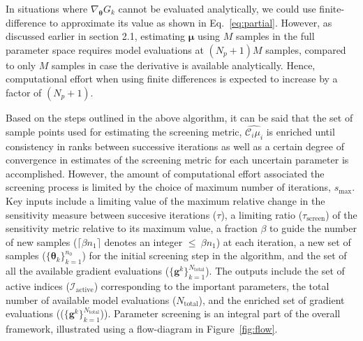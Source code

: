 In situations where $\nabla_{\bm{\theta}}G_k$ cannot be evaluated analytically, we could use finite-difference
to approximate its value as shown in Eq.~\ref{eq:partial}. However, as discussed earlier
in section 2.1, estimating $\bm{\mu}$  using $M$ samples in the full parameter space requires 
model evaluations at $(N_p+1)M$ samples, compared to only $M$ samples in 
case the derivative is available analytically. Hence, computational effort when using finite differences
is expected to increase by a factor of $(N_p+1)$.

Based on the steps outlined in the above algorithm, it can be said that the set of sample points used for
estimating the screening metric, $\widehat{\mathcal{C}_i\mu_i}$ is enriched until consistency in ranks
between successive iterations as well as a certain degree of convergence in estimates of the screening 
metric for each uncertain parameter is accomplished. However, the amount of computational effort associated
the screening process is limited by the choice of maximum number of iterations, $s_\text{max}$. Key inputs
include a limiting value of the maximum relative change in the sensitivity measure between succesive iterations
($\tau$), a limiting ratio ($\tau_\text{screen}$) of the sensitivity metric relative to its maximum value,
 a fraction $\beta$ to guide the number of new samples 
($ \lceil \beta n_1 \rceil$ denotes an integer $\leq~\beta n_1$) at each iteration,
a new set of samples ($\{ \bm{\theta}_k \}_{k = 1}^{n_0}$) for the initial screening step in the algorithm,
and the set of all the available gradient evaluations ($\{ \bm{g}^k \}_{k=1}^{N_\text{total}}$). The outputs
include the set of active indices ($\mathcal{I}_\text{active}$) corresponding to the important parameters,
the total number of available model evaluations ($N_\text{total}$), and the enriched set of gradient evaluations
(($\{ \bm{g}^k \}_{k=1}^{N_\text{total}}$)). Parameter screening is an integral part of the overall framework,
illustrated using a flow-diagram in Figure~\ref{fig:flow}.

